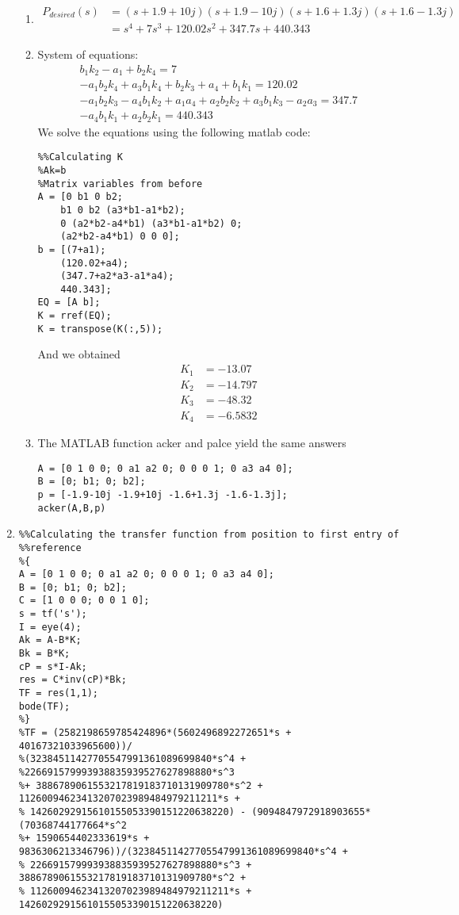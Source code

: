 \documentclass[11pt, twoside, letterpaper]{article}   	%
\begin{document}
\begin{enumerate}
\begin{enumerate}
\item
\begin{align*}
P_{desired}(s) &= (s+1.9+10j)(s+1.9-10j)(s+1.6+1.3j)(s+1.6-1.3j)\\
&= s^4+7s^3+120.02s^2+347.7s+440.343
\end{align*}

\item
System of equations:\\
\begin{align*}
b_1k_2-a_1+b_2k_4=7\\
-a_1b_2k_4+a_3b_1k_4+b_2k_3+a_4+b_1k_1=120.02\\
-a_1b_2k_3-a_4b_1k_2+a_1a_4+a_2b_2k_2+a_3b_1k_3-a_2a_3=347.7\\
-a_4b_1k_1+a_2b_2k_1=440.343
\end{align*}
We solve the equations using the following matlab code:\\
\begin{lstlisting}
%%Calculating K
%Ak=b
%Matrix variables from before
A = [0 b1 0 b2;
    b1 0 b2 (a3*b1-a1*b2);
    0 (a2*b2-a4*b1) (a3*b1-a1*b2) 0;
    (a2*b2-a4*b1) 0 0 0];
b = [(7+a1);
    (120.02+a4);
    (347.7+a2*a3-a1*a4);
    440.343];
EQ = [A b];
K = rref(EQ);
K = transpose(K(:,5));
\end{lstlisting}
And we obtained 
\begin{align*}
K_1 &= -13.07\\
K_2 &= -14.797\\
K_3 &= -48.32\\
K_4 &= -6.5832
\end{align*}

\item The MATLAB function acker and palce yield the same answers
\begin{lstlisting}
A = [0 1 0 0; 0 a1 a2 0; 0 0 0 1; 0 a3 a4 0];
B = [0; b1; 0; b2];
p = [-1.9-10j -1.9+10j -1.6+1.3j -1.6-1.3j];
acker(A,B,p)
\end{lstlisting}
\end{enumerate}
\newpage
\item
\begin{lstlisting}
%%Calculating the transfer function from position to first entry of
%%reference
%{
A = [0 1 0 0; 0 a1 a2 0; 0 0 0 1; 0 a3 a4 0];
B = [0; b1; 0; b2];
C = [1 0 0 0; 0 0 1 0];
s = tf('s');
I = eye(4);
Ak = A-B*K;
Bk = B*K;
cP = s*I-Ak;
res = C*inv(cP)*Bk;
TF = res(1,1);
bode(TF);
%}
%TF = (2582198659785424896*(5602496892272651*s + 40167321033965600))/
%(32384511427705547991361089699840*s^4 + %226691579993938835939527627898880*s^3 
%+ 3886789061553217819183710131909780*s^2 + 11260094623413207023989484979211211*s +
% 14260292915610155053390151220638220) - (9094847972918903655*(70368744177664*s^2 
%+ 1590654402333619*s + 9836306213346796))/(32384511427705547991361089699840*s^4 +
% 226691579993938835939527627898880*s^3 + 3886789061553217819183710131909780*s^2 +
% 11260094623413207023989484979211211*s + 14260292915610155053390151220638220)
\end{lstlisting}


\end{enumerate}
\end{document}
